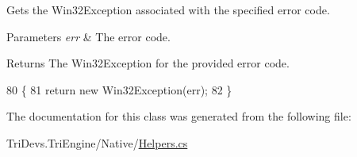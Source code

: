 Gets the Win32\-Exception associated with the specified error code. 


\begin{DoxyParams}{Parameters}
{\em err} & The error code.\\
\hline
\end{DoxyParams}
\begin{DoxyReturn}{Returns}
The Win32\-Exception for the provided error code.
\end{DoxyReturn}

\begin{DoxyCode}
80         \{
81             \textcolor{keywordflow}{return} \textcolor{keyword}{new} Win32Exception(err);
82         \}
\end{DoxyCode}


The documentation for this class was generated from the following file\-:\begin{DoxyCompactItemize}
\item 
Tri\-Devs.\-Tri\-Engine/\-Native/\hyperlink{_helpers_8cs}{Helpers.\-cs}\end{DoxyCompactItemize}
